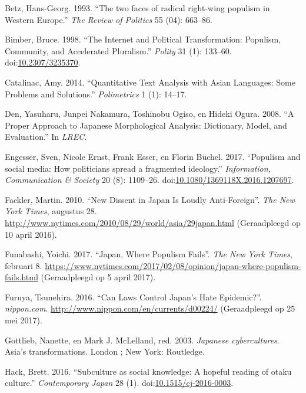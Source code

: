 \documentclass[10.5pt,dutch,]{article}
\begin{document}
\hypertarget{ref-betzux5ftwoux5f1993}{}
Betz, Hans-Georg. 1993. “The two faces of radical right-wing populism in
Western Europe.”  \emph{The Review of Politics} 55 (04): 663--86.

\hypertarget{ref-bimberux5finternetux5f1998}{}
Bimber, Bruce. 1998. “The Internet and Political Transformation:
Populism, Community, and Accelerated Pluralism.” \emph{Polity} 31 (1):
133--60. doi:\href{https://doi.org/10.2307/3235370}{10.2307/3235370}.

\hypertarget{ref-catalinacux5fquantitativeux5f2014}{}
Catalinac, Amy. 2014. “Quantitative Text Analysis with Asian Languages:
Some Problems and Solutions.”  \emph{Polimetrics} 1 (1): 14--17.

\hypertarget{ref-denux5fproperux5f2008}{}
Den, Yasuharu, Junpei Nakamura, Toshinobu Ogiso, en Hideki Ogura. 2008.
“A Proper Approach to Japanese Morphological Analysis: Dictionary, Model,
and Evaluation.”  In \emph{LREC}.

\hypertarget{ref-engesserux5fpopulismux5f2017}{}
Engesser, Sven, Nicole Ernst, Frank Esser, en Florin Büchel. 2017.
“Populism and social media: How politicians spread a fragmented ideology.”  
\emph{Information, Communication \& Society} 20 (8): 1109--26.
doi:\href{https://doi.org/10.1080/1369118X.2016.1207697}{10.1080/1369118X.2016.1207697}.

\hypertarget{ref-facklerux5fnewux5f2010}{}
Fackler, Martin. 2010. “New Dissent in Japan Is Loudly Anti-Foreign”.  \emph{The New York Times}, augustus 28. \url{http://www.nytimes.com/2010/08/29/world/asia/29japan.html} (Geraadpleegd op 10 april 2016).

\hypertarget{ref-funabashiux5fjapanux5f2017}{}
Funabashi, Yoichi. 2017. “Japan, Where Populism Fails”.  \emph{The New York Times}, februari 8. \url{https://www.nytimes.com/2017/02/08/opinion/japan-where-populism-fails.html} (Geraadpleegd op 5 april 2017).

\hypertarget{ref-furuyaux5fcanux5f2016}{}
Furuya, Tsunehira. 2016. “Can Laws Control Japan’s Hate Epidemic?”.  \emph{nippon.com}. \url{http://www.nippon.com/en/currents/d00224/} (Geraadpleegd op 25 mei 2017).

\hypertarget{ref-gottliebux5fjapaneseux5f2003}{}
Gottlieb, Nanette, en Mark J. McLelland, red. 2003. \emph{Japanese
cybercultures}. Asia's transformations. London ; New York: Routledge.

\hypertarget{ref-hackux5fsubcultureux5f2016}{}
Hack, Brett. 2016. “Subculture as social knowledge: A hopeful reading of
otaku culture.”  \emph{Contemporary Japan} 28 (1).
doi:\href{https://doi.org/10.1515/cj-2016-0003}{10.1515/cj-2016-0003}.
\end{document}
